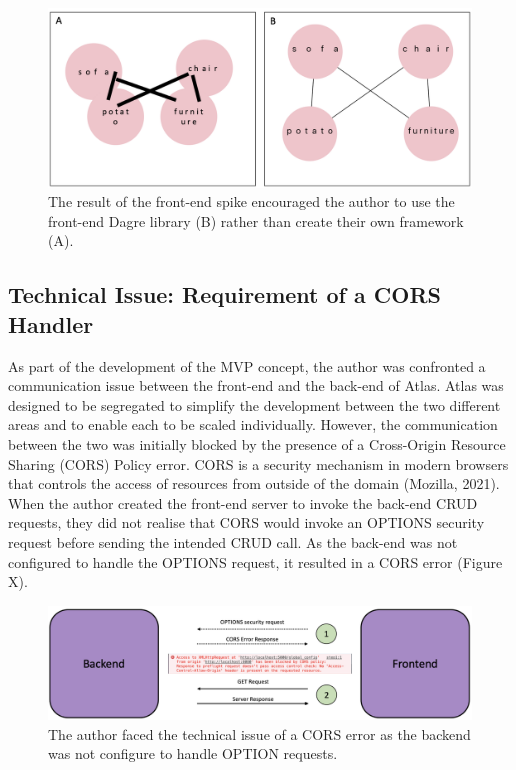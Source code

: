 \documentclass{article}
\begin{document}
\begin{figure}[!htb]
  \centering
      \includegraphics[width=1\textwidth]{images/dagre.png}
  \caption{The result of the front-end spike encouraged the author to use the front-end Dagre library (B) rather than create their own framework (A).}
\end{figure}

\subsection{Technical Issue: Requirement of a CORS Handler}

As part of the development of the MVP concept, the author was confronted a communication issue between the front-end and the back-end of Atlas. Atlas was designed to be segregated to simplify the development between the two different areas and to enable each to be scaled individually. However, the communication between the two was initially blocked by the presence of a Cross-Origin Resource Sharing (CORS) Policy error. CORS is a security mechanism in modern browsers that controls the access of resources from outside of the domain (Mozilla, 2021). When the author created the front-end server to invoke the back-end CRUD requests, they did not realise that CORS would invoke an OPTIONS security request before sending the intended CRUD call. As the back-end was not configured to handle the OPTIONS request, it resulted in a CORS error (Figure X).

\begin{figure}[!htb]
  \centering
      \includegraphics[width=1\textwidth]{images/cors.png}
  \caption{The author faced the technical issue of a CORS error as the backend was not configure to handle OPTION requests.}
\end{figure}
\end{document}
